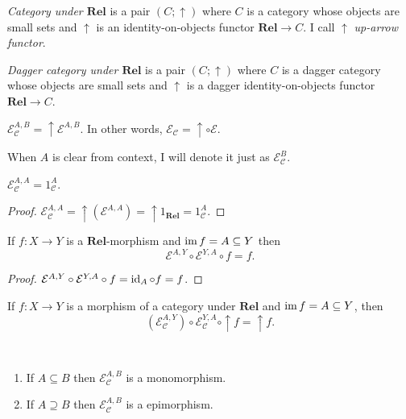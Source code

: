 \begin{defn}
\emph{Category under $\mathbf{Rel}$} is a pair $(C ; \uparrow)$
where $C$ is a category whose objects are small sets and $\uparrow$ is an
identity-on-objects functor $\mathbf{Rel} \rightarrow C$. I call
$\uparrow$ \emph{up-arrow functor}.
\end{defn}

\begin{defn}
  \emph{Dagger category under $\mathbf{Rel}$} is a pair $(C ;
  \uparrow)$ where $C$ is a dagger category whose objects are small sets and
  $\uparrow$ is a dagger identity-on-objects functor $\mathbf{Rel}
  \rightarrow C$.
\end{defn}

\begin{defn}
  $\mathcal{E}_{\mathcal{C}}^{A,B} = \uparrow \mathcal{E}^{A,B}$. In
  other words, $\mathcal{E}_{\mathcal{C}} = \uparrow \circ \mathcal{E}$.
  
  When $A$ is clear from context, I will denote it just as $\mathcal{E}_{\mathcal{C}}^B$.
\end{defn}

\begin{prop}
  $\mathcal{E}_{\mathcal{C}}^{A,A} = 1_{\mathcal{C}}^A$.
\end{prop}

\begin{proof}
  $\mathcal{E}_{\mathcal{C}}^{A,A} = \uparrow (\mathcal{E}^{A,A}) =
  \uparrow 1_{\mathbf{Rel}} = 1_{\mathcal{C}}^A$.
\end{proof}

\begin{prop}
  If $f : X \rightarrow Y$ is a $\mathbf{Rel}$-morphism and
  $\operatorname{im} f = A \subseteq Y$ then
  \[ \mathcal{E}^{A,Y} \circ \mathcal{E}^{Y,A} \circ f = f. \]
\end{prop}

\begin{proof}
  $\mathcal{E}^{A,Y} \circ \mathcal{E}^{Y,A} \circ f = \operatorname{id}_A
  \circ f = f$.
\end{proof}

\begin{cor}
  If $f : X \rightarrow Y$ is a morphism of a category under
  $\mathbf{Rel}$ and $\operatorname{im} f = A \subseteq Y$, then
  \[ (\mathcal{E}_{\mathcal{C}}^{A,Y}) \circ \mathcal{E}_{\mathcal{C}}^{Y,A}
  \circ \uparrow f = \uparrow f. \]
\end{cor}

\begin{prop}
  ~  
  \begin{enumerate}
    \item If $A \subseteq B$ then $\mathcal{E}_{\mathcal{C}}^{A,B}$ is a
    monomorphism.
    
    \item If $A \supseteq B$ then $\mathcal{E}_{\mathcal{C}}^{A,B}$ is a
    epimorphism.
  \end{enumerate}
\end{prop}

